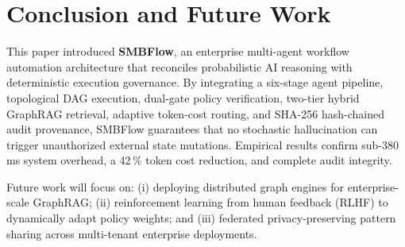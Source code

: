 \documentclass[conference]{IEEEtran}
\begin{document}
\section{Conclusion and Future Work}

This paper introduced \textbf{SMBFlow}, an enterprise multi-agent workflow automation architecture that reconciles probabilistic AI reasoning with deterministic execution governance. By integrating a six-stage agent pipeline, topological DAG execution, dual-gate policy verification, two-tier hybrid GraphRAG retrieval, adaptive token-cost routing, and SHA-256 hash-chained audit provenance, SMBFlow guarantees that no stochastic hallucination can trigger unauthorized external state mutations. Empirical results confirm sub-380\,ms system overhead, a 42\,\% token cost reduction, and complete audit integrity.

Future work will focus on: (i) deploying distributed graph engines for enterprise-scale GraphRAG; (ii) reinforcement learning from human feedback (RLHF) to dynamically adapt policy weights; and (iii) federated privacy-preserving pattern sharing across multi-tenant enterprise deployments.
\end{document}
